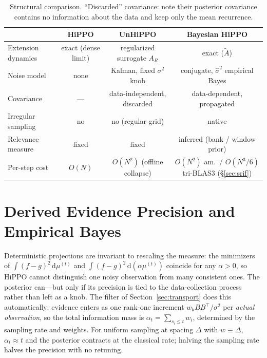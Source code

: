 \documentclass[11pt]{article}
\newcommand{\dd}{\,\mathrm{d}}
\newcommand{\mut}{\mu^{(t)}}
\newcommand{\At}{\widetilde{A}}
\begin{document}
\begin{table}[t]
\centering\small
\begin{tabular}{lccc}
\toprule
 & HiPPO & UnHiPPO & Bayesian HiPPO \\
\midrule
Extension dynamics & exact (dense limit) & regularized surrogate $A_R$ & exact ($\At$) \\
Noise model & none & Kalman, fixed $\sigma^2$ knob & conjugate, $\widehat\sigma^2$ empirical Bayes \\
Covariance & --- & data-independent, discarded & data-dependent, propagated \\
Irregular sampling & no & no (regular grid) & native \\
Relevance measure & fixed & fixed & inferred (bank / window prior) \\
Per-step cost & $O(N)$ & $O(N^2)$ (offline collapse) & $O(N^2)$ am.\ / $O(N^3/6)$ tri-BLAS3 (\S\ref{sec:srif}) \\
\bottomrule
\end{tabular}
\caption{Structural comparison. ``Discarded'' covariance: \citet{lienen2025unhippo} note their posterior covariance contains no information about the data and keep only the mean recurrence.}
\end{table}

\section{Derived Evidence Precision and Empirical Bayes}\label{sec:evidence}

Deterministic projections are invariant to rescaling the measure: the minimizers of $\int(f-g)^2\dd\mut$ and $\int(f-g)^2\dd(\alpha\mut)$ coincide for any $\alpha>0$, so HiPPO cannot distinguish one noisy observation from many consistent ones. The posterior can---but only if its precision is tied to the data-collection process rather than left as a knob. The filter of Section~\ref{sec:transport} does this automatically: evidence enters as one rank-one increment $w_kBB^\top/\sigma^2$ per \emph{actual observation}, so the total information mass is $\alpha_t=\sum_{s_i\le t}w_i$, determined by the sampling rate and weights. For uniform sampling at spacing $\Delta$ with $w\equiv\Delta$, $\alpha_t\approx t$ and the posterior contracts at the classical rate; halving the sampling rate halves the precision with no retuning.
\end{document}
